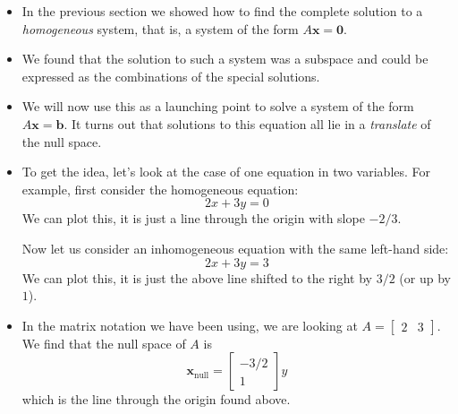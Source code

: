 \documentclass[11pt,oneside]{amsbook}
\theoremstyle{definition}
\theoremstyle{plain}
\theoremstyle{definition}
\theoremstyle{remark}
\numberwithin{equation}{section}
\numberwithin{figure}{section}
\begin{document}
\begin{itemize}
\item In the previous section we showed how to find the complete solution to a \emph{homogeneous} system, that is, a system of the form $A\mathbf{x}=\mathbf{0}$.
\item We found that the solution to such a system was a subspace and could be expressed as the combinations of the special solutions.
\item We will now use this as a launching point to solve a system of the form $A\mathbf{x}=\mathbf{b}$. It turns out that solutions to this equation all lie in a \emph{translate} of the null space.
\item To get the idea, let's look at the case of one equation in two variables. For example, first consider the homogeneous equation:
  \[2x+3y=0
  \]
  We can plot this, it is just a line through the origin with slope $-2/3$.

  Now let us consider an inhomogeneous equation with the same left-hand side:
  \[2x+3y=3
  \]
  We can plot this, it is just the above line shifted to the right by $3/2$ (or up by $1$).
\item In the matrix notation we have been using, we are looking at $A=\begin{bmatrix}2&3\end{bmatrix}$. We find that the null space of $A$ is
  \[\mathbf{x}_{\mathrm{null}}
    =\begin{bmatrix}-3/2\\1\end{bmatrix}y
  \]
  which is the line through the origin found above.


\end{itemize}
\end{document}
